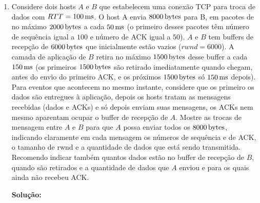 \documentclass{article}
\begin{document}
\begin{enumerate}
\item Considere dois hosts $A$ e $B$ que estabelecem uma conexão TCP para troca de dados com $RTT=\unit[100]{ms}$. O host A envia $\unit[8000]{bytes}$ para B, em pacotes de no máximo $\unit[2000]{bytes}$ a cada $\unit[50]{ms}$ (o primeiro desses pacotes têm número de sequência igual a $100$ e número de ACK igual a $50$). $A$ e $B$ tem buffers de recepção de $\unit[6000]{bytes}$ que inicialmente estão vazios ($rwnd = 6000$). A camada de aplicação de $B$ retira no máximo $\unit[1500]{bytes}$ desse buffer a cada $\unit[150]{ms}$ (os primeiros $\unit[1500]{bytes}$ são retirado imediatamente quando chegam, antes do envio do primeiro ACK, e os próximos $\unit[1500]{bytes}$ só $\unit[150]{ms}$ depois). Para eventos que acontecem no mesmo instante, considere que os primeiro os dados são entregues à aplicação, depois os hosts tratam as mensagens recebidas (dados e ACKs) e só depois enviam suas mensagens, os ACKs nem mesmo aparentam ocupar o buffer de recepção de $A$. Mostre as trocas de mensagem entre $A$ e $B$ para que $A$ possa enviar todos os $\unit[8000]{bytes}$, indicando claramente em cada mensagem os números de sequência e de ACK, o tamanho de rwnd e a quantidade de dados que está sendo transmitida. Recomendo indicar também quantos dados estão no buffer de recepção de $B$, quando são retirados e a quantidade de dados que $A$ enviou e para os quais ainda não recebeu ACK.
\begin{addmargin}[0.5in]{0.5in}
\par \textbf{Solução:}
\end{addmargin}

\end{enumerate}
\end{document}
